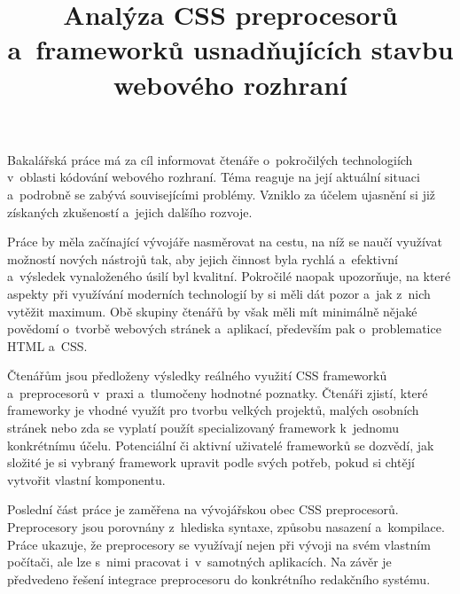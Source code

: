 \documentclass[thesis=B,czech]{FITthesis}[2012/06/26]
\title{Analýza CSS preprocesorů a~frameworků usnadňujících stavbu webového rozhraní}
\begin{document}



\begin{introduction}
	Bakalářská práce má za cíl informovat čtenáře o~pokročilých technologiích v~oblasti kódování webového rozhraní. Téma reaguje na její aktuální situaci a~podrobně se zabývá souvisejícími problémy. Vzniklo za účelem ujasnění si již získaných zkušeností a~jejich dalšího rozvoje. 

Práce by měla začínající vývojáře nasměrovat na cestu, na níž se naučí využívat možností nových nástrojů tak, aby jejich činnost byla rychlá a~efektivní a~výsledek vynaloženého úsilí byl kvalitní. Pokročilé naopak upozorňuje, na které aspekty při využívání moderních technologií by si měli dát pozor a~jak z~nich vytěžit maximum. Obě skupiny čtenářů by však měli mít minimálně nějaké povědomí o~tvorbě webových stránek a~aplikací, především pak o~problematice HTML a~CSS.

Čtenářům jsou předloženy výsledky reálného využití CSS frameworků a~preprocesorů v~praxi a~tlumočeny hodnotné poznatky. Čtenáři zjistí, které frameworky je vhodné využít pro tvorbu velkých projektů, malých osobních stránek nebo zda se vyplatí použít specializovaný framework k~jednomu konkrétnímu účelu. Potenciální či aktivní uživatelé frameworků se dozvědí, jak složité je si vybraný framework upravit podle svých potřeb, pokud si chtějí vytvořit vlastní komponentu. 

Poslední část práce je zaměřena na vývojářskou obec CSS preprocesorů. Preprocesory jsou porovnány z~hlediska syntaxe, způsobu nasazení a~kompilace. Práce ukazuje, že preprocesory se využívají nejen při vývoji na svém vlastním počítači, ale lze s~nimi pracovat i~v~samotných aplikacích. Na závěr je předvedeno řešení integrace preprocesoru do konkrétního redakčního systému. 

\end{introduction}
\end{document}

